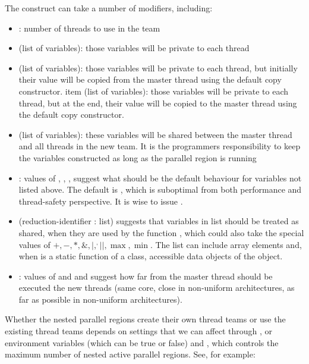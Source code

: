The construct can take a number of modifiers, including:
\begin{itemize}
\item {}: number of threads to use in the team
\item {}(list of variables): those variables will be private to each thread 
\item {}(list of variables): those variables will be private to each thread, but initially their value will be copied from the master thread using the default copy constructor. 
item (list of variables): those variables will be private to each thread, but at the end, their value will be copied to the master thread using the default copy constructor. 
\item {}(list of variables): these variables will be shared between the master thread and all threads in the new team. It is the programmers responsibility to keep the variables constructed as long as the parallel region is running
\item {}: values of , , ,  suggest what should be the default behaviour for variables not listed above. The default is , which is suboptimal from both performance and thread-safety perspective. It is wise to issue . 
\item {}(reduction-identifier : list) suggests that variables in list should be treated as shared, when they are used by the function , which could also take the special values of $+, -, *, \&, |, ^, ||, \max, \min$. The list can include array elements and, when  is a static function of a class, accessible data objects of the object. \label{sec:reduction1}
\item {}: values of  and  and  suggest how far from the master thread should be executed the new threads (same core, close in non-uniform architectures, as far as possible in non-uniform architectures).
\end{itemize}

Whether the nested parallel regions create their own thread teams or use the existing thread teams depends on   
settings that we can affect through , or environment variables  (which can be true or false) and , which controls the maximum number of nested active parallel regions.
See, for example:

